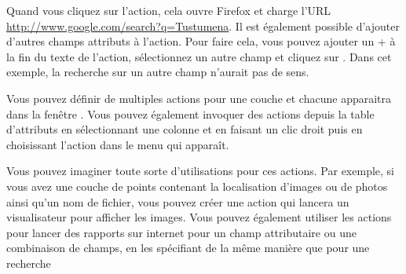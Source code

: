 Quand vous cliquez sur l'action, cela ouvre Firefox et charge l'URL \url{http://www.google.com/search?q=Tustumena}. Il est également possible d'ajouter d'autres champs attributs à l'action. Pour faire cela, vous pouvez ajouter un + à la fin du texte de l'action, sélectionnez un autre champ et cliquez sur . Dans cet exemple, la recherche sur un autre champ n'aurait pas de sens.

Vous pouvez définir de multiples actions pour une couche et chacune apparaitra dans la fenêtre . Vous pouvez également invoquer des actions depuis la table d'attributs en sélectionnant une colonne et en faisant un clic droit puis en choisissant l'action dans le menu qui apparaît.

Vous pouvez imaginer toute sorte d'utilisations pour ces actions. Par exemple, si vous avez une couche de points contenant la localisation d'images ou de photos ainsi qu'un nom de fichier, vous pouvez créer une action qui lancera un visualisateur pour afficher les images. Vous pouvez également utiliser les actions pour lancer des rapports sur internet pour un champ attributaire ou une combinaison de champs, en les spécifiant de la même manière que pour une recherche

